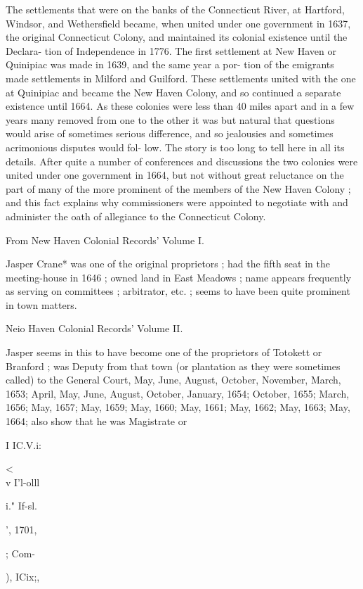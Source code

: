 \documentclass[oneside]{book}
\begin{document}
The settlements that were on the banks of the Connecticut 
River, at Hartford, Windsor, and Wethersfield became, when 
united under one government in 1637, the original Connecticut 
Colony, and maintained its colonial existence until the Declara- 
tion of Independence in 1776. The first settlement at New 
Haven or Quinipiac was made in 1639, and the same year a por- 
tion of the emigrants made settlements in Milford and Guilford. 
These settlements united with the one at Quinipiac and became 
the New Haven Colony, and so continued a separate existence 
until 1664. As these colonies were less than 40 miles apart and 
in a few years many removed from one to the other it was but 
natural that questions would arise of sometimes serious difference, 
and so jealousies and sometimes acrimonious disputes would fol- 
low. The story is too long to tell here in all its details. After 
quite a number of conferences and discussions the two colonies 
were united under one government in 1664, but not without great 
reluctance on the part of many of the more prominent of the 
members of the New Haven Colony ; and this fact explains why 
commissioners were appointed to negotiate with and administer 
the oath of allegiance to the Connecticut Colony. 

From New Haven Colonial Records' Volume I. 

Jasper Crane* was one of the original proprietors ; had the 
fifth seat in the meeting-house in 1646 ; owned land in East 
Meadows ; name appears frequently as serving on committees ; 
arbitrator, etc. ; seems to have been quite prominent in town 
matters. 

Neio Haven Colonial Records' Volume II. 

Jasper seems in this to have become one of the proprietors of 
Totokett or Branford ; was Deputy from that town (or plantation 
as they were sometimes called) to the General Court, May, June, 
August, October, November, March, 1653; April, May, June, 
August, October, January, 1654; October, 1655; March, 1656; 
May, 1657; May, 1659; May, 1660; May, 1661; May, 1662; 
May, 1663; May, 1664; also show that he was Magistrate or 




I IC.V.i: 


<\\v I'l-olll 


i." If-sl. 


', 1701, 


; Com- 


), ICix;, 
\end{document}
